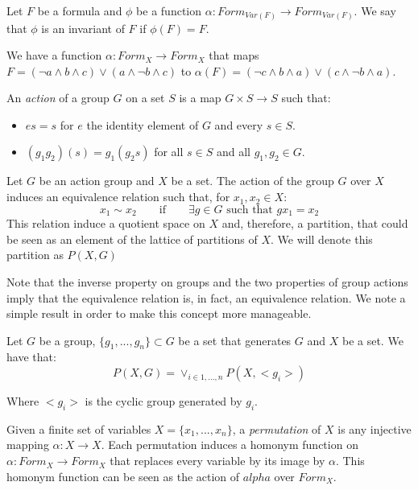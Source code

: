 \begin{definition}
Let $F$ be a formula and $\phi$ be a function $\alpha:Form_{Var(F)}\to Form_{Var(F)}$. We say that $\phi$ is an invariant of $F$ if $\phi(F) = F$.
\end{definition}

 We have a function $\alpha :Form_{X}\to Form_{X}$ that maps $F = (\neg a \land b  \land c) \lor (a \land \neg b \land c)$ to $\alpha(F) = (\neg c \land b  \land a) \lor (c \land \neg b \land a)$.\\



 \begin{definition}
  An \emph{action} of a group $G$ on a set $S$ is a map $G \times S \to S$ such that:
  \begin{itemize}
  \item $es = s$ for $e$ the identity element of $G$ and every $s\in S$.
  \item $(g_1g_2)(s) = g_1(g_2s)$ for all $s \in S$ and all $g_1,g_2\in G$.
    \end{itemize}
\end{definition}


\begin{definition}
  Let $G$ be an action group and $X$ be a set. The action of the group $G$ over $X$ induces an equivalence relation such that, for $x_1,x_2 \in X$:
  $$x_1 \sim x_2 \qquad \text{if} \qquad  \exists g\in G\text{ such that } gx_1=x_2 $$
  This relation induce a quotient space on $X$ and, therefore, a partition, that could be seen as an element of the lattice of partitions of $X$. We will denote this partition as $P(X,G)$
\end{definition}

Note that the inverse property on groups and the two properties of group actions imply that the equivalence relation is, in fact, an equivalence relation. We note a simple result in order to make this concept more manageable.

\begin{proposition}
  Let $G$ be a group, $\{g_1,...,g_n\}\subset G$ be a set that generates $G$ and $X$ be a set. We have that:
  $$P(X,G) = \lor_{i\in 1,...,n} P(X,<g_i>) $$

  Where $<g_i>$ is the cyclic group generated by $g_i$.
\end{proposition}

    
\begin{definition}[Permutation]
    Given a finite set of variables $X = \{x_1,...,x_n\}$, a \emph{permutation} of $X$ is any injective mapping $\alpha:X \to X$. Each permutation induces a homonym function on $\alpha: Form_X \to Form_X$  that replaces every variable by its image by $\alpha$. This homonym function can be seen as the action of $alpha$ over $Form_X$.
\end{definition}

